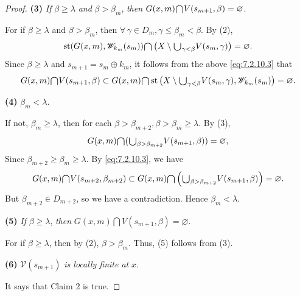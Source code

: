 \documentclass[jisng7iii.tex]{subfiles}
\begin{document}
\begin{proof}
 \textbf{(3)} \textit{If} $\beta \ge \lambda$ \textit{ and } $\beta > \beta_m$, \textit{then} $G(x, m) 
 \raisebox{-2pt}{\scalebox{1.5}{$\cap$}} V(s_{m+1}, \beta) = \varnothing$.
 
 \noindent For if $\beta \ge \lambda$ and $\beta > \beta_m$, then $\forall \, \gamma\in D_m, \gamma\le \beta_m < \beta$. 
 By (2),
 \begin{gather}
 \operatorname{st}(G(x, m), \mathscr{W}_{k_m}(s_m)) \raisebox{-2pt}{\scalebox{1.5}{$\cap$}} 
  \left(X\setminus\raisebox{-2pt}{\scalebox{1.5}{$\cup$}}_{\gamma < \beta} V(s_m, \gamma)\right) = \varnothing. \label{eq:7.2.10.4}
 \end{gather}
 Since $\beta \ge \lambda$ and $s_{m+1} = s_m\oplus k_m$, 
 it follows from the above \eqref{eq:7.2.10.3} that  %
 $$G(x, m)\raisebox{-2pt}{\scalebox{1.5}{$\cap$}} V(s_{m+1}, \beta) \subset G(x, m) \raisebox{-2pt}{\scalebox{1.5}{$\cap$}} 
    \operatorname{st}\left(X\setminus \raisebox{-2pt}{\scalebox{1.5}{$\cup$}}_{\gamma < \beta} V(s_m, \gamma), \mathscr{W}_{k_m}(s_m)\right) = \varnothing.$$
 
 \textbf{(4)} $\beta_{m} < \lambda$.
 
\noindent If not, $\beta_{m} \ge \lambda$, then for each 
 $\beta > \beta_{m+2}, \beta > \beta_{m} \ge \lambda$. By (3),
 $$G(x, m) \raisebox{-2pt}{\scalebox{1.5}{$\cap$}} (\raisebox{-2pt}{\scalebox{1.5}{$\cup$}}_{\beta > \beta_{m+2}} V(s_{m+1}, \beta)) = \varnothing,$$ 
 Since $\beta_{m+2} \ge \beta_{m} \ge \lambda$.
 By \eqref{eq:7.2.10.3}, we have 
 $$G(x, m) \raisebox{-2pt}{\scalebox{1.5}{$\cap$}} V(s_{m+2}, \beta_{m+ 2})\subset 
 G(x, m)  \raisebox{-2pt}{\scalebox{1.5}{$\cap$}} 
 \left(\raisebox{-2pt}{\scalebox{1.5}{$\cup$}}_{\beta > \beta_{m+2}}V(s_{m+1}, \beta)\right) 
 = \varnothing.$$
 But $\beta_{m+2} \in D_{m+2}$, so we have a contradiction. Hence $\beta_m < \lambda$. 
 
 \textbf{(5)} \textit{If}  $\beta \ge \lambda$, \textit{then} $G(x, m) \bigcap V(s_{m+1}, \beta) = \varnothing$.
 
\noindent For if $\beta \ge \lambda$, then by (2), $\beta > \beta_m$. Thus, (5) follows from (3).

\textbf{(6)} $\mathscr{V}(s_{m+1})$ \textit{ is locally finite at } $x$.

It says that Claim 2 is true.


\end{proof}
\end{document}
